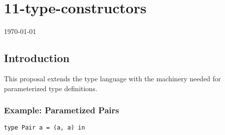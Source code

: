 \documentclass[12pt]{article}
\begin{document}
\section*{11-type-constructors}
\today %
\subsection*{Introduction}
This proposal extends the type language with the machinery needed for parameterized type definitions.
\subsubsection*{Example: Parametized Pairs}
\begin{verbatim}
type Pair a = (a, a) in
\end{verbatim}
\end{document}
